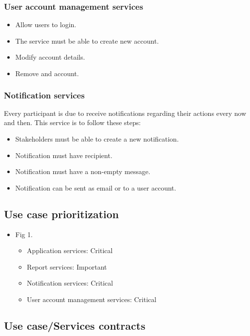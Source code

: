 \documentclass[12pt]{article}
\begin{document}
\subsubsection{User account management services} %
\begin{itemize}
	\item Allow users to login.
	\item The service must be able to create new account.
	\item Modify account details.
	\item Remove and account.
\end{itemize}
\subsubsection{Notification services}
Every participant is due to receive notifications regarding their actions every now and then. This service is to follow these steps:
\begin{itemize}
	\item Stakeholders must be able to create a new notification.
	\item Notification must have recipient.
	\item Notification must have a non-empty message.
	\item Notification can  be sent as email or to a user account.
\end{itemize}
\vspace{0.2in}
\subsection{Use case prioritization} %
\vspace{0.2in}
\begin{itemize}
\item Fig 1.
	\begin{itemize}
		\item Application services: Critical
		\item Report services: Important
		\item Notification services: Critical
		\item User account management services: Critical
	\end{itemize}
\end{itemize}


\vspace{0.2in}

\subsection{Use case/Services contracts} %
\vspace{0.2in}
\end{document}
